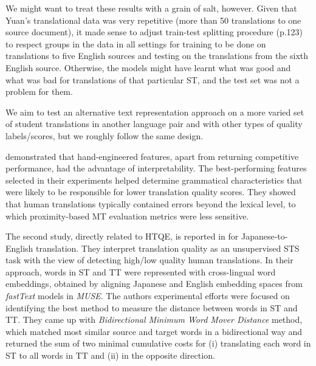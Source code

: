 We might want to treat these results with a grain of salt, however. Given that Yuan's translational data was very repetitive (more than 50 translations to one source document), it made sense to adjust train-test splitting procedure (p.123) to respect groups in the data in all settings for training to be done on translations to five English sources and testing on the translations from the sixth English source. Otherwise, the models might have learnt what was good and what was bad for translations of that particular ST, and the test set was not a problem for them. 

We aim to test an alternative text representation approach on a more varied set of student translations in another language pair and with other types of quality labels/scores, but we roughly follow the same design.

\citet{Yuan2018} demonstrated that hand-engineered features, apart from returning competitive performance, had the advantage of interpretability. The best-performing features selected in their experiments helped determine grammatical characteristics that were likely to be responsible for lower translation quality scores. They showed that human translations typically contained errors beyond the lexical level, to which proximity-based MT evaluation metrics were less sensitive.


The second study, directly related to HTQE, is reported in \citet{Zhou2019} for Japanese-to-English translation. They interpret translation quality as an unsupervised \gls{STS} task with the view of detecting high/low quality human translations. In their approach, words in ST and TT were represented with cross-lingual word embeddings, obtained by aligning Japanese and English embedding spaces from \textit{fastText} models in \textit{MUSE}. The authors experimental efforts were focused on identifying the best method to measure the distance between words in ST and TT. They came up with \textit{Bidirectional Minimum Word Mover Distance} method, which matched most similar source and target words in a bidirectional way and returned the sum of two minimal cumulative costs for (i) translating each word in ST to all words in TT and (ii) in the opposite direction. 

